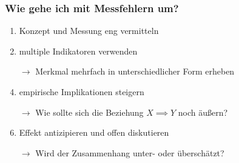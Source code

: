 \documentclass{beamer}\usepackage[]{graphicx}\usepackage[]{color}
\begin{document}
\begin{frame}
  \frametitle{Wie gehe ich mit Messfehlern um?}
  \begin{enumerate}
    \item Konzept und Messung eng vermitteln
    \item multiple Indikatoren verwenden
    \item [$\rightarrow$] Merkmal mehrfach in unterschiedlicher Form erheben
    \item empirische Implikationen steigern
    \item [$\rightarrow$] Wie sollte sich die Beziehung $X \implies Y$ noch äußern?
    \item Effekt antizipieren und offen diskutieren
    \item [$\rightarrow$] Wird der Zusammenhang unter- oder überschätzt?
  \end{enumerate}
\end{frame}
\end{document}
